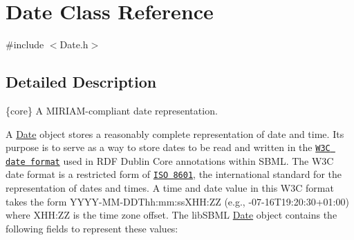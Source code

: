 \hypertarget{class_date}{}\section{Date Class Reference}
\label{class_date}


{\ttfamily \#include $<$Date.\+h$>$}



\subsection{Detailed Description}
\{core\} A M\+I\+R\+I\+A\+M-\/compliant date representation.



A \hyperlink{class_date}{Date} object stores a reasonably complete representation of date and time. Its purpose is to serve as a way to store dates to be read and written in the \href{http://www.w3.org/TR/NOTE-datetime}{\tt W3C date format} used in R\+DF Dublin Core annotations within S\+B\+ML. The W3C date format is a restricted form of \href{http://en.wikipedia.org/wiki/ISO_8601}{\tt I\+SO 8601}, the international standard for the representation of dates and times. A time and date value in this W3C format takes the form Y\+Y\+Y\+Y-\/\+M\+M-\/\+D\+D\+Thh\+:mm\+:ss\+X\+HH\+:ZZ (e.\+g., {-\/07-\/16\+T19\+:20\+:30+01\+:00}) where X\+HH\+:ZZ is the time zone offset. The lib\+S\+B\+ML \hyperlink{class_date}{Date} object contains the following fields to represent these values\+:

